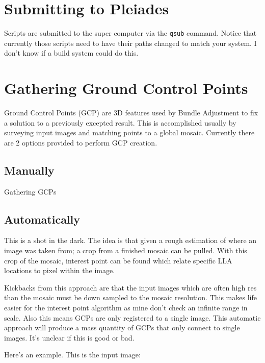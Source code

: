 \documentclass[12pt]{article}
\begin{document}
\section*{Submitting to Pleiades}

Scripts are submitted to the super computer via the \verb#qsub# command. Notice that currently those scripts need to have their paths changed to match your system. I don't know if a build system could do this.

\section{Gathering Ground Control Points}

Ground Control Points (GCP) are 3D features used by Bundle Adjustment to fix
a solution to a previously excepted result. This is accomplished
usually by surveying input images and matching points to a global
mosaic. Currently there are 2 options provided to perform GCP creation.

\subsection*{Manually}

Gathering GCPs

\subsection*{Automatically}

This is a shot in the dark. The idea is that given a rough estimation
of where an image was taken from; a crop from a finished mosaic can be
pulled. With this crop of the mosaic, interest point can be found
which relate specific LLA locations to pixel within the
image.

Kickbacks from this approach are that the input images which are often
high res than the mosaic must be down sampled to the mosaic
resolution. This makes life easier for the interest point algorithm as
mine don't check an infinite range in scale. Also this means GCPs are
only registered to a single image. This automatic approach will
produce a mass quantity of GCPs that only connect to single
images. It's unclear if this is good or bad.

Here's an example. This is the input image:
\end{document}
